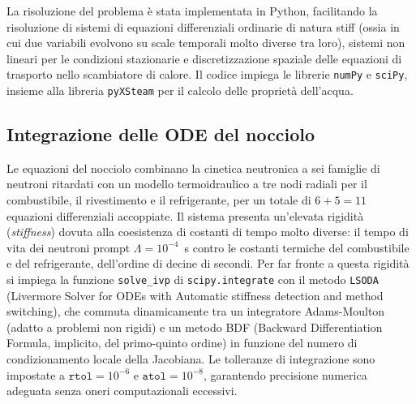 \documentclass[12pt]{report}
\begin{document}
La risoluzione del problema è stata implementata in Python, facilitando la risoluzione di sistemi di equazioni differenziali ordinarie di natura stiff (ossia in cui due variabili evolvono su scale temporali molto diverse tra loro), sistemi non lineari per le condizioni stazionarie e discretizzazione spaziale delle equazioni di trasporto nello scambiatore di calore. Il codice impiega le librerie \texttt{numPy} e \texttt{sciPy}, insieme alla libreria \texttt{pyXSteam} per il calcolo delle proprietà dell'acqua. 


\subsection{Integrazione delle ODE del nocciolo}
Le equazioni del nocciolo combinano la cinetica neutronica a sei famiglie di neutroni ritardati con un modello termoidraulico a tre nodi radiali per il combustibile, il rivestimento e il refrigerante, per un totale di $6 + 5 = 11$ equazioni differenziali accoppiate. Il sistema presenta un'elevata rigidità (\textit{stiffness}) dovuta alla coesistenza di costanti di tempo molto diverse:
il tempo di vita dei neutroni prompt $\Lambda = 10^{-4}$~s contro le costanti termiche del combustibile e del refrigerante, dell'ordine di decine di secondi. Per far fronte a questa rigidità si impiega la funzione \texttt{solve\_ivp} di \texttt{scipy.integrate} con il metodo \texttt{LSODA} (Livermore Solver for ODEs with Automatic stiffness detection and method switching), che commuta
dinamicamente tra un integratore Adams-Moulton (adatto a problemi non rigidi) e un metodo BDF (Backward Differentiation Formula, implicito, del primo-quinto ordine) in funzione del numero di condizionamento locale della Jacobiana. Le tolleranze di integrazione sono impostate a $\texttt{rtol} = 10^{-6}$ e $\texttt{atol} = 10^{-8}$, garantendo precisione numerica adeguata senza oneri computazionali eccessivi.
\end{document}
